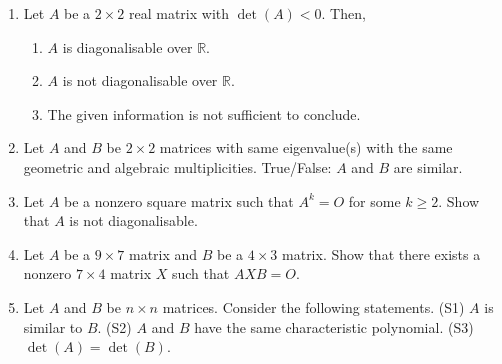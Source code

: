 \documentclass[12pt]{article}
\begin{document}
\begin{enumerate}[leftmargin=*]
	\item Let $A$ be a $2 \times 2$ real matrix with $\det(A) < 0$. Then,
	\begin{enumerate}
		\item $A$ is diagonalisable over $\mathbb{R}$.
		\item $A$ is not diagonalisable over $\mathbb{R}$.
		\item The given information is not sufficient to conclude.
	\end{enumerate}
	\item Let $A$ and $B$ be $2 \times 2$ matrices with same eigenvalue(s) with the same geometric and algebraic multiplicities. \newline
	True/False: $A$ and $B$ are similar.
	\item Let $A$ be a nonzero square matrix such that $A^{k} = O$ for some $k \ge 2$. Show that $A$ is not diagonalisable.
	\item Let $A$ be a $9 \times 7$ matrix and $B$ be a $4 \times 3$ matrix. \newline
	Show that there exists a nonzero $7 \times 4$ matrix $X$ such that $AXB = O$.
	\item Let $A$ and $B$ be $n \times n$ matrices. Consider the following statements. \newline
	(S1) $A$ is similar to $B$. \newline
	(S2) $A$ and $B$ have the same characteristic polynomial. \newline
	(S3) $\det(A) = \det(B)$. 


\end{enumerate}
\end{document}
